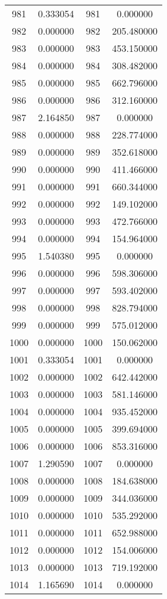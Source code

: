 \documentclass[12pt]{article}
\begin{document}
\begin{longtable}{@{}cccc@{}}
981 & 0.333054 & 981 & 0.000000 \\
982 & 0.000000 & 982 & 205.480000 \\
983 & 0.000000 & 983 & 453.150000 \\
984 & 0.000000 & 984 & 308.482000 \\
985 & 0.000000 & 985 & 662.796000 \\
986 & 0.000000 & 986 & 312.160000 \\
987 & 2.164850 & 987 & 0.000000 \\
988 & 0.000000 & 988 & 228.774000 \\
989 & 0.000000 & 989 & 352.618000 \\
990 & 0.000000 & 990 & 411.466000 \\
991 & 0.000000 & 991 & 660.344000 \\
992 & 0.000000 & 992 & 149.102000 \\
993 & 0.000000 & 993 & 472.766000 \\
994 & 0.000000 & 994 & 154.964000 \\
995 & 1.540380 & 995 & 0.000000 \\
996 & 0.000000 & 996 & 598.306000 \\
997 & 0.000000 & 997 & 593.402000 \\
998 & 0.000000 & 998 & 828.794000 \\
999 & 0.000000 & 999 & 575.012000 \\
1000 & 0.000000 & 1000 & 150.062000 \\
1001 & 0.333054 & 1001 & 0.000000 \\
1002 & 0.000000 & 1002 & 642.442000 \\
1003 & 0.000000 & 1003 & 581.146000 \\
1004 & 0.000000 & 1004 & 935.452000 \\
1005 & 0.000000 & 1005 & 399.694000 \\
1006 & 0.000000 & 1006 & 853.316000 \\
1007 & 1.290590 & 1007 & 0.000000 \\
1008 & 0.000000 & 1008 & 184.638000 \\
1009 & 0.000000 & 1009 & 344.036000 \\
1010 & 0.000000 & 1010 & 535.292000 \\
1011 & 0.000000 & 1011 & 652.988000 \\
1012 & 0.000000 & 1012 & 154.006000 \\
1013 & 0.000000 & 1013 & 719.192000 \\
1014 & 1.165690 & 1014 & 0.000000 \\

\end{longtable}
\end{document}
